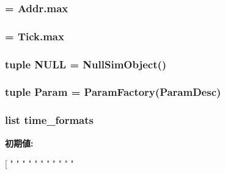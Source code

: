 \label{namespacem5_1_1params_ab05a03249670abb258a9dd7c2a435443}
\hypertarget{namespacem5_1_1params_a1f3beab4ce06468d9eb110330d9b711e}{
\subsubsection[{MaxAddr}]{ = Addr.max}}
\label{namespacem5_1_1params_a1f3beab4ce06468d9eb110330d9b711e}
\hypertarget{namespacem5_1_1params_ace890b2e52c70259bb9ff990f8a46467}{
\subsubsection[{MaxTick}]{ = Tick.max}}
\label{namespacem5_1_1params_ace890b2e52c70259bb9ff990f8a46467}
\hypertarget{namespacem5_1_1params_a1e2e219ac4e913a2c59019be3094d3ca}{
\subsubsection[{NULL}]{\setlength{\rightskip}{0pt plus 5cm}tuple {\bf NULL} = {\bf NullSimObject}()}}
\label{namespacem5_1_1params_a1e2e219ac4e913a2c59019be3094d3ca}
\hypertarget{namespacem5_1_1params_a14d3aee4aac12be641ec918c73cfcd9c}{
\subsubsection[{Param}]{\setlength{\rightskip}{0pt plus 5cm}tuple {\bf Param} = {\bf ParamFactory}({\bf ParamDesc})}}
\label{namespacem5_1_1params_a14d3aee4aac12be641ec918c73cfcd9c}
\hypertarget{namespacem5_1_1params_a878cd16311a4da1b6c4ac703b9cb6034}{
\subsubsection[{time\_\-formats}]{\setlength{\rightskip}{0pt plus 5cm}list {\bf time\_\-formats}}}
\label{namespacem5_1_1params_a878cd16311a4da1b6c4ac703b9cb6034}
{\bfseries 初期値:}
\begin{DoxyCode}
[ "%
                 "%
                 "%
                 "%
                 "%
                 "%
                 "%
                 "%
                 "%
                 "%
                 "%
\end{DoxyCode}
